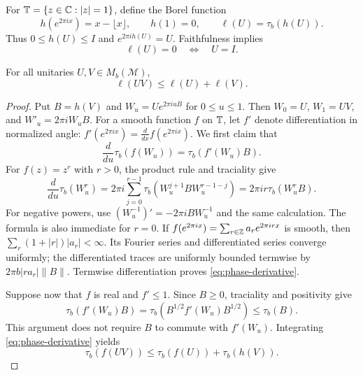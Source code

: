 For $\mathbb T=\{z\in\mathbb C:|z|=1\}$, define the Borel function
\[
 h(e^{2\pi ix})=x-\lfloor x\rfloor,\qquad h(1)=0,
 \qquad \ell(U)=\tau_b(h(U)).
\]
Thus $0\leq h(U)\leq I$ and $e^{2\pi i h(U)}=U$.  Faithfulness implies
\begin{equation}\label{eq:phase-faithfulness}
 \ell(U)=0\quad\Longleftrightarrow\quad U=I.
\end{equation}

\begin{lemma}\label{lem:phase}
For all unitaries $U,V\in M_b(\mathcal M)$,
\[
 \ell(UV)\leq\ell(U)+\ell(V).
\]
\end{lemma}

\begin{proof}
Put $B=h(V)$ and $W_u=Ue^{2\pi iuB}$ for $0\leq u\leq1$.
Then $W_0=U$, $W_1=UV$, and $W'_u=2\pi iW_uB$.
For a smooth function $f$ on $\mathbb T$, let $f'$ denote differentiation
in normalized angle:
$f'(e^{2\pi ix})=\frac{d}{dx}f(e^{2\pi ix})$.
We first claim that
\begin{equation}\label{eq:phase-derivative}
 \frac{d}{du}\tau_b(f(W_u))=\tau_b(f'(W_u)B).
\end{equation}
For $f(z)=z^r$ with $r>0$, the product rule and traciality give
\[
 \frac{d}{du}\tau_b(W_u^r)
 =2\pi i\sum_{j=0}^{r-1}\tau_b(W_u^{j+1}BW_u^{r-1-j})
 =2\pi ir\tau_b(W_u^rB).
\]
For negative powers, use $(W_u^{-1})'=-2\pi iBW_u^{-1}$ and the
same calculation.  The formula is also immediate for $r=0$.
If $f(e^{2\pi ix})=\sum_{r\in\mathbb Z}a_re^{2\pi irx}$ is smooth, then
$\sum_r(1+|r|)|a_r|<\infty$.  Its Fourier series and differentiated
series converge uniformly; the differentiated traces are uniformly
bounded termwise by $2\pi b|r a_r|\lVert B\rVert$.
Termwise differentiation proves \eqref{eq:phase-derivative}.

Suppose now that $f$ is real and $f'\leq1$.  Since $B\geq0$,
traciality and positivity give
\[
 \tau_b(f'(W_u)B)
 =\tau_b(B^{1/2}f'(W_u)B^{1/2})\leq\tau_b(B).
\]
This argument does not require $B$ to commute with $f'(W_u)$.
Integrating \eqref{eq:phase-derivative} yields
\begin{equation}\label{eq:phase-smooth-bound}
 \tau_b(f(UV))\leq\tau_b(f(U))+\tau_b(h(V)).
\end{equation}


\end{proof}
